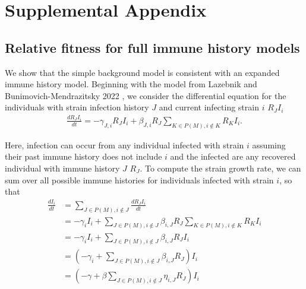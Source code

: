 \documentclass[12pt,oneside,letterpaper]{article}
\begin{document}



\newpage

\appendix

\setcounter{figure}{0}
\setcounter{table}{0}
\setcounter{page}{1}
\renewcommand{\thefigure}{S\arabic{figure}}
\renewcommand{\thetable}{S\arabic{table}}
\renewcommand{\thepage}{S\arabic{page}}
\renewcommand{\thesubsection}{S\arabic{subsection}}

\section*{Supplemental Appendix}

\subsection{Relative fitness for full immune history models}\label{ssec:full_immune_history}


We show that the simple background model is consistent with an expanded immune history model.
Beginning with the model from Lazebnik and Bunimovich-Mendrazitsky 2022 \cite{Lazebnik2022}, we consider the differential equation for the individuals with strain infection history $J$ and current infecting strain $i$ $R_{J}I_{i}$
\begin{align*}
\frac{dR_{J} I_{i}}{dt} = - \gamma_{J, i} R_{J} I_{i} + \beta_{J, i} R_{J} \sum_{K \in P(M), i\notin K} R_{K}I_{i}.
\end{align*}

Here, infection can occur from any individual infected with strain $i$ assuming their past immune history does not include $i$ and the infected are any recovered individual with immune history $J$  $R_{J}$.
To compute the strain growth rate, we can sum over all possible immune histories for individuals infected with strain $i$, so that
\begin{align*}
    \frac{d I_{i}}{d t} &= \sum_{J \in P(M), i \notin J} \frac{dR_{J} I_{i}}{dt} \\
                        &= - \gamma_{i} I_{i} + \sum_{J \in P(M), i \notin J} \beta_{i, J} R_{J} \sum_{K \in P(M), i\notin K} R_{K}I_{i}\\
                        &= - \gamma_{i} I_{i} + \sum_{J \in P(M), i \notin J} \beta_{i, J} R_{J} I_{i}\\
                        &= \left(-\gamma_{i} + \sum_{J \in P(M), i \notin J} \beta_{i,J} R_{J} \right) I_{i}\\
                        &= \left(-\gamma + \beta\sum_{J \in P(M), i \notin J} \eta_{i,J} R_{J} \right) I_{i}\\
\end{align*}
\end{document}
